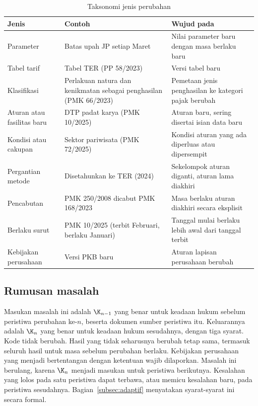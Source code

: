 \begin{table}[t]
\centering
\caption{Taksonomi jenis perubahan}
\label{tab:jenis}
\scriptsize
\begin{tabularx}{\columnwidth}{@{}P{1.8cm} P{2.5cm} L@{}}
\toprule
\textbf{Jenis} & \textbf{Contoh} & \textbf{Wujud pada } \\
\midrule
Parameter & Batas upah JP setiap Maret & Nilai parameter baru dengan masa berlaku baru \\
Tabel tarif & Tabel TER (PP 58/2023) & Versi tabel baru \\
Klasifikasi & Perlakuan natura dan kenikmatan sebagai penghasilan (PMK 66/2023) & Pemetaan jenis penghasilan ke kategori pajak berubah \\
Aturan atau fasilitas baru & DTP padat karya (PMK 10/2025) & Aturan baru, sering disertai isian data baru \\
Kondisi atau cakupan & Sektor pariwisata (PMK 72/2025) & Kondisi aturan yang ada diperluas atau dipersempit \\
Pergantian metode & Disetahunkan ke TER (2024) & Sekelompok aturan diganti, aturan lama diakhiri \\
Pencabutan & PMK 250/2008 dicabut PMK 168/2023 & Masa berlaku aturan diakhiri secara eksplisit \\
Berlaku surut & PMK 10/2025 (terbit Februari, berlaku Januari) & Tanggal mulai berlaku lebih awal dari tanggal terbit \\
Kebijakan perusahaan & Versi PKB baru & Aturan lapisan perusahaan berubah \\
\bottomrule
\end{tabularx}
\end{table}


\subsection{Rumusan masalah}
\label{subsec:rumusan}

Masukan masalah ini adalah  $\K_{n-1}$ yang benar untuk keadaan hukum sebelum peristiwa perubahan ke-$n$, beserta dokumen sumber peristiwa itu. Keluarannya adalah $\K_n$ yang benar untuk keadaan hukum sesudahnya, dengan tiga syarat. Kode  tidak berubah. Hasil yang tidak seharusnya berubah tetap sama, termasuk seluruh hasil untuk masa sebelum perubahan berlaku. Kebijakan perusahaan yang menjadi bertentangan dengan ketentuan wajib dilaporkan. Masalah ini berulang, karena $\K_n$ menjadi masukan untuk peristiwa berikutnya. Kesalahan yang lolos pada satu peristiwa dapat terbawa, atau memicu kesalahan baru, pada peristiwa sesudahnya. Bagian~\ref{subsec:adaptif} menyatakan syarat-syarat ini secara formal.
